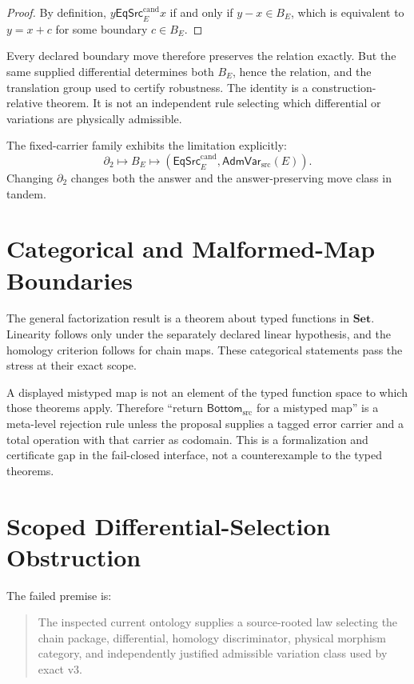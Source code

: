 \documentclass[11pt]{article}
\newcommand{\EqCand}{\mathsf{EqSrc}^{\mathrm{cand}}}
\newcommand{\AdmVar}{\mathsf{AdmVar}_{\mathrm{src}}}
\newcommand{\Bottom}{\mathsf{Bottom}_{\mathrm{src}}}
\begin{document}
\begin{proof}
By definition, \(y\EqCand_E x\) if and only if \(y-x\in B_E\), which is
equivalent to \(y=x+c\) for some boundary \(c\in B_E\).
\end{proof}

Every declared boundary move therefore preserves the relation exactly. But
the same supplied differential determines both \(B_E\), hence the relation,
and the translation group used to certify robustness. The identity is a
construction-relative theorem. It is not an independent rule selecting
which differential or variations are physically admissible.

The fixed-carrier family exhibits the limitation explicitly:
\[
 \partial_2
 \longmapsto B_E
 \longmapsto
 \left(\EqCand_E,\AdmVar(E)\right).
\]
Changing \(\partial_2\) changes both the answer and the answer-preserving move
class in tandem.

\section{Categorical and Malformed-Map Boundaries}

The general factorization result is a theorem about typed functions in
\(\mathbf{Set}\). Linearity follows only under the separately declared linear
hypothesis, and the homology criterion follows for chain maps. These
categorical statements pass the stress at their exact scope.

A displayed mistyped map is not an element of the typed function space to
which those theorems apply. Therefore ``return \(\Bottom\) for a mistyped
map'' is a meta-level rejection rule unless the proposal supplies a tagged
error carrier and a total operation with that carrier as codomain. This is a
formalization and certificate gap in the fail-closed interface, not a
counterexample to the typed theorems.

\section{Scoped Differential-Selection Obstruction}

The failed premise is:

\begin{quote}
The inspected current ontology supplies a source-rooted law selecting the
chain package, differential, homology discriminator, physical morphism
category, and independently justified admissible variation class used by
exact v3.
\end{quote}
\end{document}
